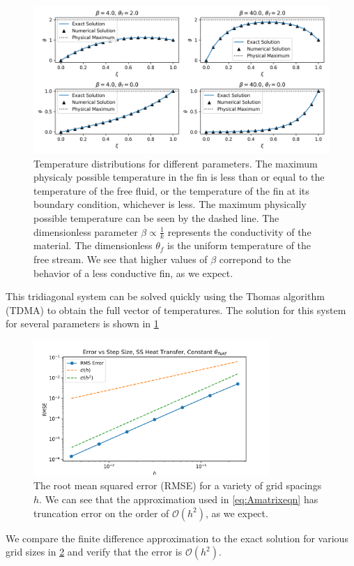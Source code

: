 \documentclass[10pt,letterpaper,notitlepage]{article}
\begin{document}
    \begin{figure}
        \centering
        \includegraphics[width=\textwidth]{figures/Temperature Distributions for Different Parameters.png}
        \caption{Temperature distributions for different parameters. The maximum physicaly possible temperature in the fin is less than or equal to the temperature of the free fluid, or the temperature of the fin at its boundary condition, whichever is less. The maximum physically possible temperature can be seen by the dashed line. The dimensionless parameter $\beta \propto \frac{1}{k}$ represents the conductivity of the material. The dimensionless $\theta_f$ is the uniform temperature of the free stream. We see that higher values of $\beta$ correpond to the behavior of a less conductive fin, as we expect.}
        \label{fig:TemperatureDistributions}
    \end{figure}
    This tridiagonal system can be solved quickly using the Thomas algorithm (TDMA) to obtain the full vector of temperatures. The solution for this system for several parameters is shown in \cref{fig:TemperatureDistributions}
    \begin{figure}
        \centering
        \includegraphics[width=0.8\textwidth]{figures/RMS Error vs h.png}
        \caption{The root mean squared error (RMSE) for a variety of grid spacings $h$. We can see that the approximation used in \cref{eq:Amatrixeqn} has truncation error on the order of $\mathcal{O}(h^2)$, as we expect.}
        \label{fig:RMSError}
    \end{figure}
    We compare the finite difference approximation to the exact solution for various grid sizes in \cref{fig:RMSError} and verify that the error is $\mathcal{O}(h^2)$. 
\end{document}
